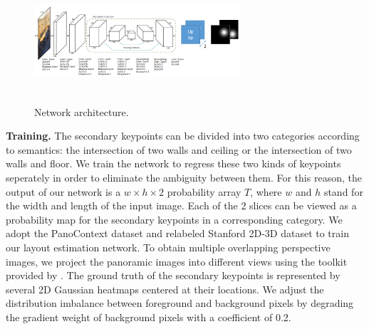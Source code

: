 \begin{figure}
	\includegraphics[height=1.5in, width=3in]{figs/network.png}
	\label{fig:network}
	\caption{Network architecture.}
\end{figure}

\noindent\textbf{Training.} The secondary keypoints can be divided into two categories according to semantics: the intersection of two walls and ceiling or the intersection of two walls and floor. We train the network to regress these two kinds of keypoints seperately in order to eliminate the ambiguity between them. For this reason, the output of our network is a $w \times h \times 2$ probability array $T$, where $w$ and $h$ stand for the width and length of the input image. Each of the 2 slices can be viewed as a probability map for the secondary keypoints in a corresponding category. We adopt the PanoContext dataset \cite{pano} and relabeled Stanford 2D-3D dataset \cite{layoutnet} to train our layout estimation network. To obtain multiple overlapping perspective images, we project the panoramic images into different views using the toolkit provided by \cite{pano}. The ground truth of the secondary keypoints is represented by several 2D Gaussian heatmaps centered at their locations. We adjust the distribution imbalance between foreground and background pixels by degrading the gradient weight of background pixels with a coefficient of 0.2.



